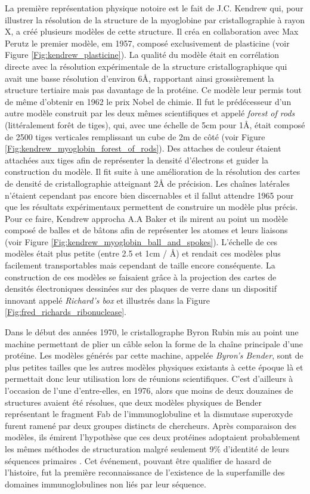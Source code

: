 La première représentation physique notoire est le fait de J.C. Kendrew qui, pour illustrer la résolution de la structure de la myoglobine par cristallographie \cite{kendrew1958three} à rayon X, a créé plusieurs modèles de cette structure. Il créa en collaboration avec Max Perutz le premier modèle, em 1957, composé exclusivement de plasticine (voir Figure \ref{Fig:kendrew_plasticine}). La qualité du modèle était en corrélation directe avec la résolution expérimentale de la structure cristallographique qui avait une basse résolution d'environ 6\r{A}, rapportant ainsi grossièrement la structure tertiaire mais pas davantage de la protéine. Ce modèle leur permis tout de même d'obtenir en 1962 le prix Nobel de chimie. Il fut le prédécesseur d'un autre modèle construit par les deux mêmes scientifiques et appelé \textit{forest of rods} (littéralement forêt de tiges), qui, avec une échelle de 5cm pour 1\r{A}, était composé de 2500 tiges verticales remplissant un cube de 2m de côté (voir Figure \ref{Fig:kendrew_myoglobin_forest_of_rods}). Des attaches de couleur étaient attachées aux tiges afin de représenter la densité d'électrons et guider la construction du modèle. Il fit suite à une amélioration de la résolution des cartes de densité de cristallographie atteignant 2\r{A} de précision. Les chaînes latérales n'étaient cependant pas encore bien discernables et il fallut attendre 1965 pour que les résultats expérimentaux permettent de construire un modèle plus précis. Pour ce faire, Kendrew approcha A.A Baker et ils mirent au point un modèle composé de balles et de bâtons afin de représenter les atomes et leurs liaisons (voir Figure \ref{Fig:kendrew_myoglobin_ball_and_spokes}). L'échelle de ces modèles était plus petite (entre 2.5 et 1cm / \r{A}) et rendait ces modèles plus facilement transportables mais cependant de taille encore conséquente. La construction de ces modèles se faisaient grâce à la projection des cartes de densités électroniques dessinées sur des plaques de verre dans un dispositif innovant appelé \textit{Richard's box} et illustrés dans la Figure \ref{Fig:fred_richards_ribonuclease}.

Dans le début des années 1970, le cristallographe Byron Rubin mis au point une machine permettant de plier un câble selon la forme de la chaîne principale d'une protéine. Les modèles générés par cette machine, appelée \textit{Byron's Bender}, sont de plus petites tailles que les autres modèles physiques existants à cette époque là et permettait donc leur utilisation lors de réunions scientifiques. C'est d'ailleurs à l'occasion de l'une d'entre-elles, en 1976, alors que moins de deux douzaines de structures avaient été résolues, que deux modèles physiques de Bender représentant le fragment Fab de l'immunoglobuline et la dismutase superoxyde furent ramené par deux groupes distincts de chercheurs. Après comparaison des modèles, ils émirent l'hypothèse que ces deux protéines adoptaient probablement les mêmes méthodes de structuration malgré seulement 9\% d'identité de leurs séquences primaires \cite{richardson1976similarity}. Cet événement, pouvant être qualifier de hasard de l'histoire, fut la première reconnaissance de l'existence de la superfamille des domaines immunoglobulines non liés par leur séquence.

